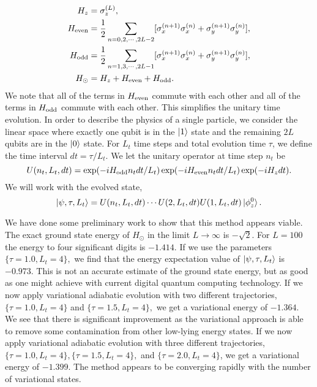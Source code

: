\documentclass[10pt]{article}
\begin{document}
\begin{align}
H_z &= \sigma_z^{(L)}, \\
H_{\rm even} &= \frac{1}{2} \sum_{n=0,2,\cdots,2L-2} [\sigma_x^{(n+1)}\sigma_x^{(n)}
+ \sigma_y^{(n+1)}\sigma_y^{(n)}], \\
H_{\rm odd} &= \frac{1}{2} \sum_{n=1,3,\cdots,2L-1} [\sigma_x^{(n+1)}\sigma_x^{(n)}
+ \sigma_y^{(n+1)}\sigma_y^{(n)}], \\
H_\odot &= H_z + H_{\rm even} + H_{\rm odd}.
\end{align}
We note that all of the terms in $H_{\rm even}$ commute with each other and all of the terms in $H_{\rm odd}$ commute with each other.  This simplifies the unitary time evolution.  In order to describe the physics of a single particle, we consider the linear space where exactly one qubit is in the $\ket{1}$ state and the remaining $2L$ qubits are in the  $\ket{0}$ state.  For $L_t$ time steps and total evolution time $\tau$, we define the time interval $dt=\tau/L_t$.  We let the unitary operator at time step $n_t$ be
\begin{equation}
U(n_t,L_{t},dt) = \exp(-iH_{\rm odd}n_tdt/L_t)\exp(-iH_{\rm even}n_tdt/L_t)\exp(-iH_ zdt).   
\end{equation} 
We will work with the evolved state,
\begin{equation}
\ket{\psi,\tau,L_t} = U(n_t,L_{t},dt) \cdots U(2,L_{t},dt)U(1,L_{t},dt)\ket{\phi_z^0}. 
\end{equation}

We have done some preliminary work to show that this method appears
viable. The exact ground state energy of $H_\odot$ in the limit $L
\rightarrow \infty$ is $-\sqrt{2}$.  For $L = 100$ the energy to four
significant digits is $-1.414$. If we use the parameters $\{\tau =
1.0,L_t = 4\},$ we find that the energy expectation value of
$\ket{\psi,\tau,L_t}$ is $-0.973$.  This is not an accurate estimate
of the ground state energy, but as good as one might achieve with
current digital quantum computing technology.  If we now apply
variational adiabatic evolution with two different trajectories,
$\{\tau = 1.0,L_t = 4\}$ and $\{\tau = 1.5,L_t = 4\},$ we get a
variational energy of $-1.364$.  We see that there is significant
improvement as the variational approach is able to remove some
contamination from other low-lying energy states. If we now apply
variational adiabatic evolution with three different trajectories,
$\{\tau = 1.0,L_t = 4\}, \{\tau = 1.5,L_t = 4\},$ and $\{\tau =
2.0,L_t = 4\}$, we get a variational energy of $-1.399$.  The method
appears to be converging rapidly with the number of variational
states.
\end{document}
